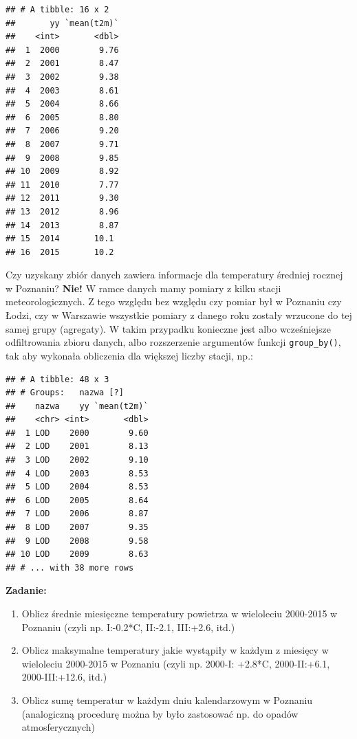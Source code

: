 \documentclass[]{book}
\newenvironment{Shaded}{\begin{snugshade}}{\end{snugshade}}
\newcommand{\KeywordTok}[1]{\textcolor[rgb]{0.13,0.29,0.53}{\textbf{#1}}}
\newcommand{\StringTok}[1]{\textcolor[rgb]{0.31,0.60,0.02}{#1}}
\newcommand{\OperatorTok}[1]{\textcolor[rgb]{0.81,0.36,0.00}{\textbf{#1}}}
\newcommand{\NormalTok}[1]{#1}
\providecommand{\tightlist}{%
  \setlength{\itemsep}{0pt}\setlength{\parskip}{0pt}}
\theoremstyle{definition}
\theoremstyle{definition}
\theoremstyle{definition}
\theoremstyle{remark}
\begin{document}
\begin{verbatim}
## # A tibble: 16 x 2
##       yy `mean(t2m)`
##    <int>       <dbl>
##  1  2000        9.76
##  2  2001        8.47
##  3  2002        9.38
##  4  2003        8.61
##  5  2004        8.66
##  6  2005        8.80
##  7  2006        9.20
##  8  2007        9.71
##  9  2008        9.85
## 10  2009        8.92
## 11  2010        7.77
## 12  2011        9.30
## 13  2012        8.96
## 14  2013        8.87
## 15  2014       10.1 
## 16  2015       10.2
\end{verbatim}

Czy uzyskany zbiór danych zawiera informacje dla temperatury średniej
rocznej w Poznaniu? \textbf{Nie!} W ramce danych mamy pomiary z kilku
stacji meteorologicznych. Z tego względu bez względu czy pomiar był w
Poznaniu czy Łodzi, czy w Warszawie wszystkie pomiary z danego roku
zostały wrzucone do tej samej grupy (agregaty). W takim przypadku
konieczne jest albo wcześniejsze odfiltrowania zbioru danych, albo
rozszerzenie argumentów funkcji \texttt{group\_by()}, tak aby wykonała
obliczenia dla większej liczby stacji, np.:

\begin{Shaded}
\end{Shaded}

\begin{verbatim}
## # A tibble: 48 x 3
## # Groups:   nazwa [?]
##    nazwa    yy `mean(t2m)`
##    <chr> <int>       <dbl>
##  1 LOD    2000        9.60
##  2 LOD    2001        8.13
##  3 LOD    2002        9.10
##  4 LOD    2003        8.53
##  5 LOD    2004        8.53
##  6 LOD    2005        8.64
##  7 LOD    2006        8.87
##  8 LOD    2007        9.35
##  9 LOD    2008        9.58
## 10 LOD    2009        8.63
## # ... with 38 more rows
\end{verbatim}

\textbf{Zadanie:}

\begin{enumerate}
\def\labelenumi{\arabic{enumi}.}
\tightlist
\item
  Oblicz średnie miesięczne temperatury powietrza w wieloleciu 2000-2015
  w Poznaniu (czyli np. I:-0.2*C, II:-2.1, III:+2.6, itd.)
\item
  Oblicz maksymalne temperatury jakie wystąpiły w każdym z miesięcy w
  wieloleciu 2000-2015 w Poznaniu (czyli np. 2000-I: +2.8*C,
  2000-II:+6.1, 2000-III:+12.6, itd.)
\item
  Oblicz sumę temperatur w każdym dniu kalendarzowym w Poznaniu
  (analogiczną procedurę można by było zastosować np. do opadów
  atmosferycznych)
\end{enumerate}
\end{document}

